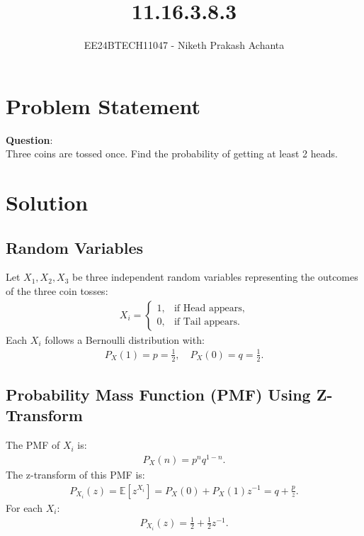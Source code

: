 \documentclass[journal]{IEEEtran}
\begin{document}
	

\vspace{3cm}

\title{11.16.3.8.3}
\author{EE24BTECH11047 - Niketh Prakash Achanta}
{\let\newpage\relax\maketitle}

\renewcommand{\thefigure}{\theenumi}
\renewcommand{\thetable}{\theenumi}
\setlength{\intextsep}{10pt} %

\renewcommand{\thetable}{\theenumi}

\section{Problem Statement}
\textbf{Question}:\\
Three coins are tossed once. Find the probability of getting at least 2 heads.

\section{Solution}

\subsection{Random Variables}
Let $ X_1, X_2, X_3 $ be three independent random variables representing the outcomes of the three coin tosses:
\begin{align}
X_i =
\begin{cases}
1, & \text{if Head appears,} \\
0, & \text{if Tail appears.}
\end{cases}
\end{align}
Each $X_i$ follows a Bernoulli distribution with:
\begin{align}
P_{X}(1) = p = \frac{1}{2}, \quad P_{X}(0) = q = \frac{1}{2}.
\end{align}

\subsection{Probability Mass Function (PMF) Using Z-Transform}
The PMF of $X_i$ is:
\begin{align}
P_{X}(n) = p^{n} q^{1-n}.
\end{align}
The z-transform of this PMF is:
\begin{align}
P_{X_i}(z) = \mathbb{E}[z^{X_i}] = P_{X}(0) + P_{X}(1) z^{-1} = q + \frac{p}{z}.
\end{align}
For each $X_i$:
\begin{align}
P_{X_i}(z) = \frac{1}{2} + \frac{1}{2}z^{-1}.
\end{align}
\end{document}
